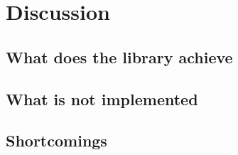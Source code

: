 
\chapter{Discussion}
\label{ch:discussion}


\section{What does the library achieve}
\section{What is not implemented}
\section{Shortcomings}


